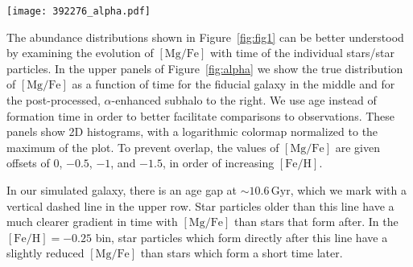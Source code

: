 \documentclass[twocolumn,linenumbers]{aastex631}
\newcommand{\Gyr}{\ensuremath{\textrm{Gyr}}}
\newcommand{\FeH}{\ensuremath{[\textrm{Fe}/\textrm{H}]}}
\newcommand{\MgFe}{\ensuremath{[\textrm{Mg}/\textrm{Fe}]}}
\newcommand{\dex}{\ensuremath{\textrm{dex}}}
\begin{document}
\begin{figure*}
  \centering
  \texttt{[image: 392276\_alpha.pdf]}
  \caption{\textbf{Bimodality in the abundance plane is linked to distinct epochs separated by quiescence in simulation.} The upper panels show \MgFe{} as a function of age for our subhalo in TNG. The colors indicate stellar populations at fixed values of \FeH{}, which are the same as in Figure~\ref{fig:fig1}. A gap in the relation occurs at an age of approximately $10.6\,\Gyr$, which we indicate with a vertical dashed line. The effect of the $\alpha$-enhancement is clear, as it separates the stars that form before and after this gap in ages (star particles which formed before $z=1.5$ are $\alpha$-enhanced, which occurs at an age of $\sim9.5\,\Gyr$). The lower panels show on the left the Milky Way and on the center and right the data from TNG but with $12.5\%$ age errors and $0.01\,\dex$ errors in \MgFe{}. When the simulations are given these errors, we see that the before and after star particles smear such that the two populations significantly overlap in ages. In the $\alpha$-enhanced galaxy, two populations emerge in each bin which overlapped in the fiducial distribution. This feature more closely resembles the Milky Way, which displays such populations where the bimodality is strongest -- $\FeH=-0.5$ (blue) and $-0.25$ (orange).}
  \label{fig:alpha}
\end{figure*}

The abundance distributions shown in Figure~\ref{fig:fig1} can be better understood by examining the evolution of \MgFe{} with time of the individual stars/star particles. In the upper panels of Figure~\ref{fig:alpha} we show the true distribution of \MgFe{} as a function of time for the fiducial galaxy in the middle and for the post-processed, $\alpha$-enhanced subhalo to the right. We use age instead of formation time in order to better facilitate comparisons to observations. These panels show 2D histograms, with a logarithmic colormap normalized to the maximum of the plot. To prevent overlap, the values of \MgFe{} are given offsets of $0$, $-0.5$, $-1$, and $-1.5$, in order of increasing \FeH{}.

In our simulated galaxy, there is an age gap at $\sim10.6\,\Gyr$, which we mark with a vertical dashed line in the upper row. Star particles older than this line have a much clearer gradient in time with \MgFe{} than stars that form after. In the $\FeH=-0.25$ bin, star particles which form directly after this line have a slightly reduced \MgFe{} than stars which form a short time later.
\end{document}
